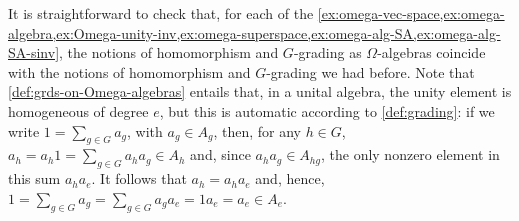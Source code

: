 \label{lemma:1-has-deg-e}

It is straightforward to check that, for each of the \cref{ex:omega-vec-space,ex:omega-algebra,ex:Omega-unity-inv,ex:omega-superspace,ex:omega-alg-SA,ex:omega-alg-SA-sinv}, the notions of homomorphism and $G$-grading as $\Omega$-algebras coincide with the notions of homomorphism and $G$-grading we had before. 
Note that \cref{def:grds-on-Omega-algebras} entails that, in a unital algebra, the unity element is homogeneous of degree $e$, but this is automatic according to \cref{def:grading}: 
if we write $1 = \sum_{g\in G} a_g$, with $a_g \in A_g$, then, for any $h\in G$, $a_h = a_h 1 = \sum_{g\in G} a_h a_g \in A_h$ and, since $a_h a_g \in A_{hg}$, the only nonzero element in this sum $a_h a_e$. 
It follows that $a_h = a_h a_e$ and, hence, $1 = \sum_{g\in G} a_g = \sum_{g\in G} a_g a_e = 1 a_e = a_e \in A_e$. 

